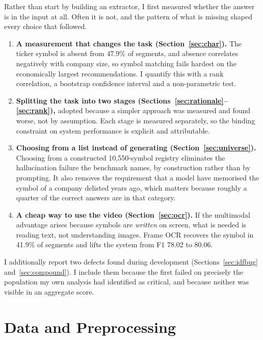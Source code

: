 \documentclass[conference]{IEEEtran}
\begin{document}
Rather than start by building an extractor, I first measured whether the
answer is in the input at all. Often it is not, and the pattern of what is
missing shaped every choice that followed.

\begin{enumerate}
\item \textbf{A measurement that changes the task
(Section~\ref{sec:char}).} The ticker symbol is absent from 47.9\% of segments,
and absence correlates negatively with company size, so symbol matching fails
hardest on the economically largest recommendations. I quantify this with a rank
correlation, a bootstrap confidence interval and a non-parametric test.

\item \textbf{Splitting the task into two stages
(Sections~\ref{sec:rationale}--\ref{sec:rank}),} adopted because a simpler approach was
measured and found worse, not by assumption. Each stage is measured separately, so the
binding constraint on system performance is explicit and attributable.

\item \textbf{Choosing from a list instead of generating (Section~\ref{sec:universe}).}
Choosing from a constructed 10{,}550-symbol registry eliminates the
hallucination failure the benchmark names, by construction rather than by
prompting. It also removes the requirement that a model have memorised the
symbol of a company delisted years ago, which matters because roughly a quarter
of the correct answers are in that category.

\item \textbf{A cheap way to use the video
(Section~\ref{sec:ocr}).} If the multimodal advantage arises because symbols are
\emph{written} on screen, what is needed is reading text, not
understanding images. Frame OCR recovers the symbol in 41.9\% of segments and
lifts the system from F1 78.02 to 80.06.
\end{enumerate}

I additionally report two defects found during development
(Sections~\ref{sec:idfbug} and~\ref{sec:compound}). I include them because the
first failed on precisely the population my own analysis had identified as
critical, and because neither was visible in an aggregate score.

\section{Data and Preprocessing}
\end{document}
